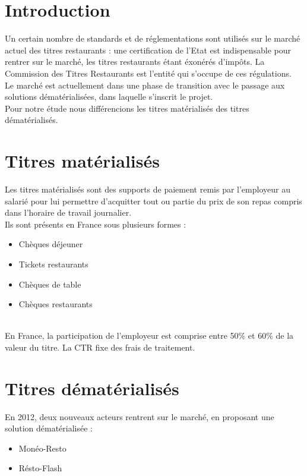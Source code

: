 




\section{Introduction}
Un certain nombre de standards et de réglementations sont utilisés sur le
marché actuel des titres restaurants : une certification de l’Etat est
indispensable pour rentrer sur le marché, les titres restaurants étant éxonérés
d’impôts. La Commission des Titres Restaurants est l’entité qui s’occupe de
ces régulations. \\

Le marché est actuellement dans une phase de transition avec le passage aux
solutions dématérialisées, dans laquelle s’inscrit le projet. \\

Pour notre étude nous différencions les titres matérialisés des titres
dématérialisés. \\

\section{Titres matérialisés}
Les titres matérialisés sont des supports de paiement remis par l'employeur au
salarié pour lui permettre d'acquitter tout ou partie du prix de son repas
compris dans l'horaire de travail journalier. \\

Ils sont présents en France sous plusieurs formes :
\begin{itemize}
  \item Chèques déjeuner
  \item Tickets restaurants
  \item Chèques de table
  \item Chèques restaurants
\end{itemize}

~\\
En France, la participation de l'employeur est comprise entre 50\% et 60\% de
la valeur du titre. La CTR fixe des frais de traitement. \\

\section{Titres dématérialisés}
En 2012, deux nouveaux acteurs rentrent sur le marché, en proposant une
solution dématérialisée :
\begin{itemize}
  \item Monéo-Resto
  \item Résto-Flash
\end{itemize}

